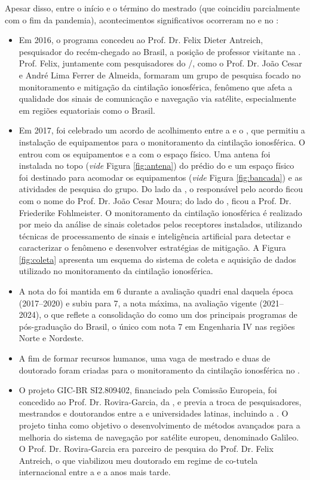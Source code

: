 \documentclass{article}
\begin{document}
Apesar disso, entre o início e o término do mestrado (que coincidiu parcialmente com o fim da pandemia), acontecimentos significativos ocorreram no  e no :
\begin{itemize}
  \item Em 2016, o programa concedeu ao Prof. Dr. Felix Dieter Antreich, pesquisador do  recém-chegado ao Brasil, a posição de professor visitante na  \cite{ribamarnetoTimeForaQue2017}. Prof. Felix, juntamente com pesquisadores do /, como o Prof. Dr. João Cesar e André Lima Ferrer de Almeida, formaram um grupo de pesquisa focado no monitoramento e mitigação da cintilação ionosférica, fenômeno que afeta a qualidade dos sinais de comunicação e navegação via satélite, especialmente em regiões equatoriais como o Brasil.
  \item Em 2017, foi celebrado um acordo de acolhimento entre a  e o , que permitiu a instalação de equipamentos para o monitoramento da cintilação ionosférica. O  entrou com os equipamentos e a  com o espaço físico. Uma antena foi instalada no topo (\textit{vide} Figura \ref{fig:antena}) do prédio do  e um espaço físico foi destinado para acomodar os equipamentos (\textit{vide} Figura \ref{fig:bancada}) e as atividades de pesquisa do grupo. Do lado da , o responsável pelo acordo ficou com o nome do Prof. Dr. João Cesar Moura; do lado do , ficou a Prof. Dr. Friederike Fohlmeister. O monitoramento da cintilação ionosférica é realizado por meio da análise de sinais  coletados pelos receptores instalados, utilizando técnicas de processamento de sinais e inteligência artificial para detectar e caracterizar o fenômeno e desenvolver estratégias de mitigação. A Figura \ref{fig:coleta} apresenta um esquema do sistema de coleta e aquisição de dados utilizado no monitoramento da cintilação ionosférica.
  \item A nota  do  foi mantida em 6 durante a avaliação quadri
enal daquela época (2017--2020) e subiu para 7, a nota máxima, na avaliação vigente (2021--2024), o que reflete a consolidação do  como um dos principais programas de pós-graduação do Brasil, o único com nota 7 em Engenharia IV nas regiões Norte e Nordeste.
  \item A fim de formar recursos humanos, uma vaga de mestrado e duas de doutorado foram criadas para o monitoramento da cintilação ionosférica no .
  \item O projeto GIC-BR SI2.809402, financiado pela Comissão Europeia, foi concedido ao Prof. Dr. Rovira-Garcia, da , e previa a troca de pesquisadores, mestrandos e doutorandos entre a  e universidades latinas, incluindo a . O projeto tinha como objetivo o desenvolvimento de métodos avançados para a melhoria do sistema de navegação por satélite europeu, denominado Galileo. O Prof. Dr. Rovira-Garcia era parceiro de pesquisa do Prof. Dr. Felix Antreich, o que viabilizou meu doutorado em regime de co-tutela internacional entre a  e a  anos mais tarde.

\end{itemize}
\end{document}
